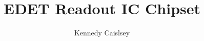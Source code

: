 \documentclass{article}
\title{EDET Readout IC Chipset}
\author{Kennedy Caislsey}
\begin{document}
\section{}
\end{document}
